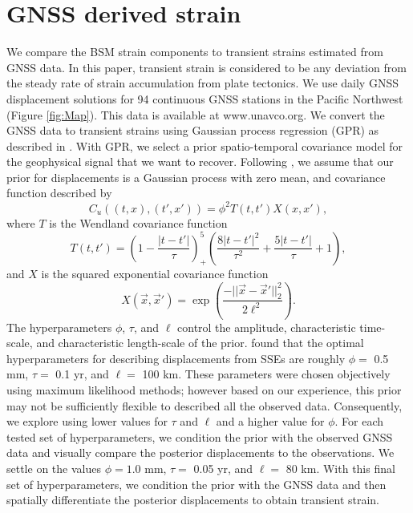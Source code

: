 \documentclass[10pt,a4paper]{article}
\begin{document}
\section{GNSS derived strain}
We compare the BSM strain components to transient strains estimated from GNSS data. In this paper, transient strain is considered to be any deviation from the steady rate of strain accumulation from plate tectonics.  We use daily GNSS displacement solutions for 94 continuous GNSS stations in the Pacific Northwest (Figure \ref{fig:Map}). This data is available at www.unavco.org. We convert the GNSS data to transient strains using Gaussian process regression (GPR) as described in \citet{Hines2017a}. With GPR, we select a prior spatio-temporal covariance model for the geophysical signal that we want to recover. Following \citet{Hines2017a}, we assume that our prior for displacements is a Gaussian process with zero mean, and covariance function described by 
\begin{equation}\label{cov}
C_u((t,x),(t',x')) = \phi^2 T(t,t')X(x,x'),
\end{equation}        
where $T$ is the Wendland covariance function
\begin{equation}\label{eq:Wendland}
T(t,t') = \left(1 - \frac{|t - t'|}{\tau}\right)^5_+ \left(\frac{8|t - t'|^2}{\tau^2} + \frac{5|t - t'|}{\tau} + 1\right), 
\end{equation}
and $X$ is the squared exponential covariance function
\begin{equation}\label{eq:SE}
X(\vec{x},\vec{x}') = \exp\left(\frac{-||\vec{x} - \vec{x}'||_2^2}{2 \ell^2}\right).
\end{equation}
The hyperparameters $\phi$, $\tau$, and $\ell$ control the amplitude, characteristic time-scale, and characteristic length-scale of the prior. \citet{Hines2017a} found that the optimal hyperparameters for describing displacements from SSEs are roughly $\phi =$ 0.5 mm, $\tau =$ 0.1 yr, and $\ell =$ 100 km. These parameters were chosen objectively using maximum likelihood methods; however based on our experience, this prior may not be sufficiently flexible to described all the observed data. Consequently, we explore using lower values for $\tau$ and $\ell$ and a higher value for $\phi$. For each tested set of hyperparameters, we condition the prior with the observed GNSS data and visually compare the posterior displacements to the observations. We settle on the values $\phi = 1.0$ mm, $\tau =$ 0.05 yr, and $\ell =$ 80 km. With this final set of hyperparameters, we condition the prior with the GNSS data and then spatially differentiate the posterior displacements to obtain transient strain.
\end{document}
